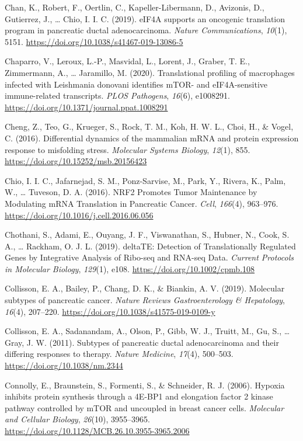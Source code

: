 \documentclass[12pt,openany]{book}
\begin{document}
\hypertarget{ref-Chan2019}{}
Chan, K., Robert, F., Oertlin, C., Kapeller-Libermann, D., Avizonis, D.,
Gutierrez, J., \ldots{} Chio, I. I. C. (2019). eIF4A supports an
oncogenic translation program in pancreatic ductal adenocarcinoma.
\emph{Nature Communications}, \emph{10}(1), 5151.
\url{https://doi.org/10.1038/s41467-019-13086-5}

\hypertarget{ref-Chaparro2020}{}
Chaparro, V., Leroux, L.-P., Masvidal, L., Lorent, J., Graber, T. E.,
Zimmermann, A., \ldots{} Jaramillo, M. (2020). Translational profiling
of macrophages infected with Leishmania donovani identifies mTOR- and
eIF4A-sensitive immune-related transcripts. \emph{PLOS Pathogens},
\emph{16}(6), e1008291.
\url{https://doi.org/10.1371/journal.ppat.1008291}

\hypertarget{ref-Cheng2016}{}
Cheng, Z., Teo, G., Krueger, S., Rock, T. M., Koh, H. W. L., Choi, H.,
\& Vogel, C. (2016). Differential dynamics of the mammalian mRNA and
protein expression response to misfolding stress. \emph{Molecular
Systems Biology}, \emph{12}(1), 855.
\url{https://doi.org/10.15252/msb.20156423}

\hypertarget{ref-Chio2016}{}
Chio, I. I. C., Jafarnejad, S. M., Ponz-Sarvise, M., Park, Y., Rivera,
K., Palm, W., \ldots{} Tuveson, D. A. (2016). NRF2 Promotes Tumor
Maintenance by Modulating mRNA Translation in Pancreatic Cancer.
\emph{Cell}, \emph{166}(4), 963--976.
\url{https://doi.org/10.1016/j.cell.2016.06.056}

\hypertarget{ref-Chothani2019}{}
Chothani, S., Adami, E., Ouyang, J. F., Viswanathan, S., Hubner, N.,
Cook, S. A., \ldots{} Rackham, O. J. L. (2019). deltaTE: Detection of
Translationally Regulated Genes by Integrative Analysis of Ribo-seq and
RNA-seq Data. \emph{Current Protocols in Molecular Biology},
\emph{129}(1), e108. \url{https://doi.org/10.1002/cpmb.108}

\hypertarget{ref-Collisson2019}{}
Collisson, E. A., Bailey, P., Chang, D. K., \& Biankin, A. V. (2019).
Molecular subtypes of pancreatic cancer. \emph{Nature Reviews
Gastroenterology \& Hepatology}, \emph{16}(4), 207--220.
\url{https://doi.org/10.1038/s41575-019-0109-y}

\hypertarget{ref-Collisson2011}{}
Collisson, E. A., Sadanandam, A., Olson, P., Gibb, W. J., Truitt, M.,
Gu, S., \ldots{} Gray, J. W. (2011). Subtypes of pancreatic ductal
adenocarcinoma and their differing responses to therapy. \emph{Nature
Medicine}, \emph{17}(4), 500--503. \url{https://doi.org/10.1038/nm.2344}

\hypertarget{ref-Connolly2006}{}
Connolly, E., Braunstein, S., Formenti, S., \& Schneider, R. J. (2006).
Hypoxia inhibits protein synthesis through a 4E-BP1 and elongation
factor 2 kinase pathway controlled by mTOR and uncoupled in breast
cancer cells. \emph{Molecular and Cellular Biology}, \emph{26}(10),
3955--3965. \url{https://doi.org/10.1128/MCB.26.10.3955-3965.2006}
\end{document}
